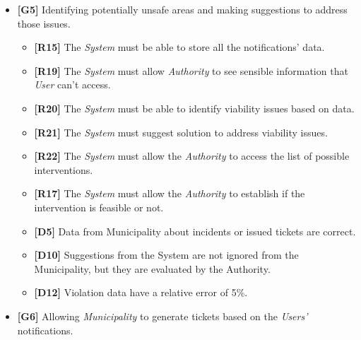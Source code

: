 \documentclass {article}
\begin{document}
\begin{itemize}
\begin{itemize}
   			 \item {\bf [R16]} All violation data used for statistics are validated by the {\it Municipality}.
   			 \item {\bf [R18]} The {\it System} must allow the {\it User} to visualise statistics derived from the data.
   			 \item {\bf [R19]} The {\it System} must allow {\it Authority} to see sensible information that {\it User} can't access. 
   			 \item {\bf [D7]} Permission to access GPS and device data is granted to the System.
   			 \item {\bf [D12]} Violation data have a relative error of 5\%. 
			 \end{itemize}		  
   			 \item {\bf [G5]} Identifying potentially unsafe areas and making suggestions to address those issues.
   		    	\begin{itemize}
   		    	\item {\bf [R15]} The {\it System} must be able to store all the notifications' data.
   		        \item {\bf [R19]} The {\it System} must allow {\it Authority} to see sensible information that {\it User} can't access.
   		    	\item {\bf [R20]} The {\it System} must be able to identify viability issues based on data.
   		    	\item {\bf [R21]} The {\it System} must suggest solution to address viability issues.
   		    	\item {\bf [R22]} The {\it System} must allow the {\it Authority} to access the list of possible interventions. 
   		    	\item {\bf [R17]} The {\it System} must allow the {\it Authority} to establish if the intervention is feasible or not.
   		    	\item {\bf [D5]} Data from Municipality about incidents or issued tickets are correct.
   		    	\item {\bf [D10]} Suggestions from the System are not ignored from the Municipality, but they are evaluated by the Authority.
   		    	\item {\bf [D12]} Violation data have a relative error of 5\%. 
			 \end{itemize}
			  \item {\bf [G6]} Allowing {\it Municipality} to generate tickets based on the {\it Users'} notifications. 
			  \begin{itemize}

\end{itemize}
\end{itemize}
\end{document}
